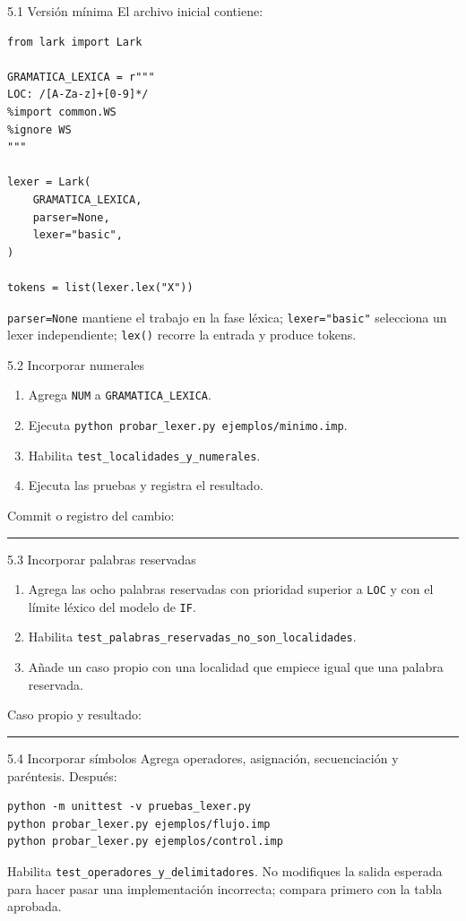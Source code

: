 \documentclass[11pt,spanish]{article}
\newcommand{\blank}[1][4cm]{\rule{#1}{0.4pt}}
\begin{document}
\begin{modelo}{5.1 Versión mínima}
El archivo inicial contiene:

\begin{lstlisting}
from lark import Lark

GRAMATICA_LEXICA = r"""
LOC: /[A-Za-z]+[0-9]*/
%import common.WS
%ignore WS
"""

lexer = Lark(
    GRAMATICA_LEXICA,
    parser=None,
    lexer="basic",
)

tokens = list(lexer.lex("X"))
\end{lstlisting}

\texttt{parser=None} mantiene el trabajo en la fase léxica; \texttt{lexer="basic"} selecciona un lexer independiente; \texttt{lex()} recorre la entrada y produce tokens.
\end{modelo}

\begin{estacion}{5.2 Incorporar numerales}
\begin{enumerate}
  \item Agrega \texttt{NUM} a \texttt{GRAMATICA\_LEXICA}.
  \item Ejecuta \texttt{python probar\_lexer.py ejemplos/minimo.imp}.
  \item Habilita \texttt{test\_localidades\_y\_numerales}.
  \item Ejecuta las pruebas y registra el resultado.
\end{enumerate}

Commit o registro del cambio: \blank[8cm]
\end{estacion}

\begin{estacion}{5.3 Incorporar palabras reservadas}
\begin{enumerate}
  \item Agrega las ocho palabras reservadas con prioridad superior a \texttt{LOC} y con el límite léxico del modelo de \texttt{IF}.
  \item Habilita \texttt{test\_palabras\_reservadas\_no\_son\_localidades}.
  \item Añade un caso propio con una localidad que empiece igual que una palabra reservada.
\end{enumerate}

Caso propio y resultado: \blank[8cm]
\end{estacion}

\begin{estacion}{5.4 Incorporar símbolos}
Agrega operadores, asignación, secuenciación y paréntesis. Después:

\begin{lstlisting}
python -m unittest -v pruebas_lexer.py
python probar_lexer.py ejemplos/flujo.imp
python probar_lexer.py ejemplos/control.imp
\end{lstlisting}

Habilita \texttt{test\_operadores\_y\_delimitadores}. No modifiques la salida esperada para hacer pasar una implementación incorrecta; compara primero con la tabla aprobada.
\end{estacion}
\end{document}

